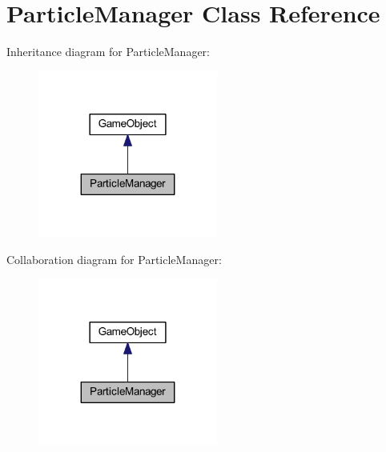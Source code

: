 \hypertarget{class_particle_manager}{\section{Particle\+Manager Class Reference}
\label{class_particle_manager}
}


Inheritance diagram for Particle\+Manager\+:\nopagebreak
\begin{figure}[H]
\begin{center}
\leavevmode
\includegraphics[width=167pt]{class_particle_manager__inherit__graph}
\end{center}
\end{figure}


Collaboration diagram for Particle\+Manager\+:\nopagebreak
\begin{figure}[H]
\begin{center}
\leavevmode
\includegraphics[width=167pt]{class_particle_manager__coll__graph}
\end{center}
\end{figure}
